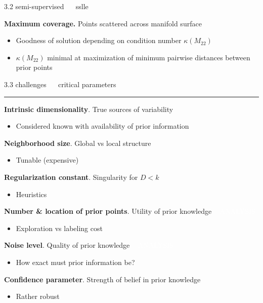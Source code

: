\documentclass[11pt, compress, t, notes = noshow, xcolor = table, 
aspectratio = 1610]{beamer}
\newcommand{\maketag}[1]{\colorbox{highlightcol}{\textcolor{white}
{\MakeUppercase{#1}}}}
\newcommand{\highlight}[1]{\textcolor{highlightcol}{\textbf{#1}}}
\newcommand{\arritem}{\item[\highlight{$\rightarrow$}]}
\begin{document}
\begin{frame}{\textcolor{gray!90}{3.2 semi-supervised} ~~ sslle}
\vspace{0.3cm}

\textbf{Maximum coverage.} Points scattered across manifold surface

\begin{itemize}
  \arritem Goodness of solution depending on condition number $\kappa(M_{22})$
  \arritem $\kappa(M_{22})$ minimal at maximization of minimum pairwise 
  distances between prior points
\end{itemize}

\end{frame}


\LARGE
\begin{frame}{\textcolor{gray!90}{3.3 challenges} ~~ critical parameters}
\normalsize
\vspace{-0.5cm}
\noindent \textcolor{gray!90}{\rule{\textwidth}{1pt}}
\smallskip

\textbf{Intrinsic dimensionality}. True sources of variability

\begin{itemize}
  \arritem Considered known with availability of prior information
\end{itemize}

\textbf{Neighborhood size}. Global vs local structure

\begin{itemize}
  \arritem Tunable (expensive)
\end{itemize}

\textbf{Regularization constant}. Singularity for $D < k$

\begin{itemize}
  \arritem Heuristics
\end{itemize}

\textbf{Number \& location of prior points}. Utility of prior knowledge ~ 
\maketag{analysis}

\begin{itemize}
  \arritem Exploration vs labeling cost
\end{itemize}

\textbf{Noise level}. Quality of prior knowledge ~ 
\maketag{analysis}

\begin{itemize}
  \arritem How exact must prior information be?
\end{itemize}

\textbf{Confidence parameter}. Strength of belief in prior knowledge 

\begin{itemize}
  \arritem Rather robust
\end{itemize}



\end{frame}
\end{document}
